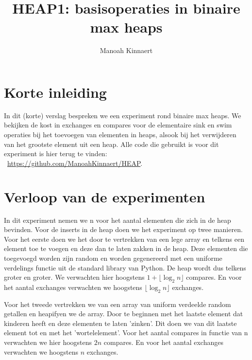 \documentclass[12pt, dutch]{article}
\title{HEAP1: basisoperaties in binaire max heaps}
\author{Manoah Kinnaert}
\begin{document}
\begin{titlepage}
    \maketitle
\end{titlepage}
\pagebreak
\section{Korte inleiding}
In dit (korte) verslag bespreken we een experiment rond binaire max heaps. We bekijken de kost in exchanges en compares voor de elementaire sink en swim operaties 
bij het toevoegen van elementen in heaps, alsook bij het verwijderen van het grootste element uit een heap.
Alle code die gebruikt is voor dit experiment is hier terug te vinden: \\\ 
\url{https://github.com/ManoahKinnaert/HEAP}.

\section{Verloop van de experimenten}
In dit experiment nemen we n voor het aantal elementen die zich in de heap bevinden.  
Voor de inserts in de heap doen we het experiment op twee manieren.
Voor het eerste doen we het door te vertrekken van een lege array en telkens een element toe te voegen en deze dan te laten zakken in de heap.
Deze elementen die toegevoegd worden zijn random en worden gegenereerd met een uniforme verdelings functie uit de standard library van Python.
De heap wordt dus telkens groter en groter. We verwachten hier hoogstens \begin{math} 1 + \lfloor \log_2 n \rfloor \end{math} compares.
En voor het aantal exchanges verwachten we hoogstens \begin{math} \lfloor \log_2 n \rfloor \end{math} exchanges.

Voor het tweede vertrekken we van een array van uniform verdeelde random getallen en heapifyen we de array. 
Door te beginnen met het laatste element dat kinderen heeft en deze elementen te laten 'zinken'. Dit doen we van dit laatste element 
tot en met het 'wortelelement'. Voor het aantal compares in functie van n verwachten we hier hoogstens \begin{math} 2n\end{math} compares.
En voor het aantal exchanges verwachten we hoogstens \begin{math} n \end{math} exchanges.
\end{document}
